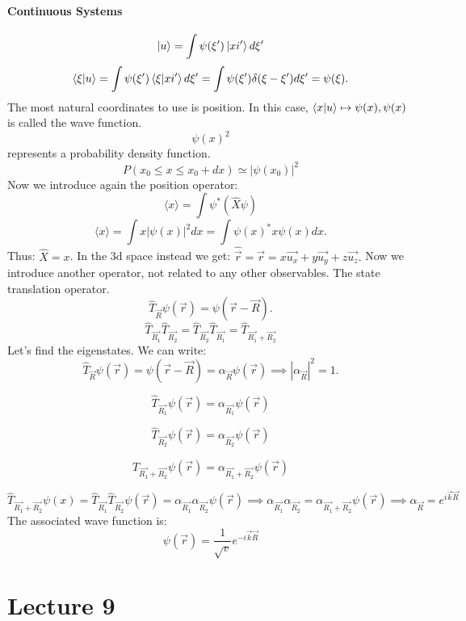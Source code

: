 \documentclass{article}
\begin{document}
\paragraph{Continuous Systems}

$$\ket{u} = \int \psi(\xi') \ket{xi'} d\xi'$$
$$\bra{\xi}\ket{u} = \int \psi (\xi') \bra{\xi}\ket{xi'}d\xi' = \int \psi (\xi') \delta(\xi -\xi') d\xi' =\psi(\xi).$$
The most natural coordinates to use is position. In this case,
$\bra{x}\ket{u} \mapsto \psi(x), \psi(x)$ is called the wave function.
$$\psi(x)^2$$ represents a probability density function.
$$P(x_0 \leq x \leq x_0 + dx) \simeq | \psi(x_0) |^2$$
Now we introduce again the position operator:
$$\langle x \rangle = \int \psi^* ( \hat{X} \psi)$$
$$ \langle x \rangle  = \int x | \psi(x) | ^2 dx = \int \psi(x)^* x \psi(x) dx.$$
Thus: $\hat{X} = x$. In the 3d space instead we get: $ \hat{\vec{r}} = \vec{r} = x \vec{u_x} + y \vec{u_y} + z \vec{u_z}. $
Now we introduce another operator, not related to any other observables. The state translation operator.
$$\hat{T}_{\vec{R}} \psi(\vec{r}) = \psi(\vec{r}-\vec{R}).$$
$$\hat{T}_{\vec{R_1}}\hat{T}_{\vec{R_2}} = \hat{T}_{\vec{R_2}}\hat{T}_{\vec{R_1}} = \hat{T}_{\vec{R_1}+ \vec{R_2}}$$
Let's find the eigenstates. We can write:
$$\hat{T}_{\vec{R}} \psi(\vec{r}) = \psi(\vec{r}-\vec{R}) = \alpha_{\vec{R}} \psi(\vec{r}) \implies |\alpha_{\vec{R}}|^2 = 1.$$

$$\hat{T}_{\vec{R_1}} \psi(\vec{r}) = \alpha_{\vec{R_1}} \psi(\vec{r})$$

$$\hat{T}_{\vec{R_2}} \psi(\vec{r}) =  \alpha_{\vec{R_2}}\psi(\vec{r})$$

$$ \hat{T}_{\vec{R_1} + \vec{R_2} } \psi(\vec{r}) = \alpha_{\vec{R_1} + \vec{R_2}} \psi(\vec{r}) $$

$$\hat{T}_{\vec{R_1} + \vec{R_2}} \psi(x) = \hat{T}_{\vec{R_1}}\hat{T}_{\vec{R_2}} \psi(\vec{r}) =\alpha_{\vec{R_1}} \alpha_{\vec{R_2}}\psi(\vec{r})  \implies \alpha_{\vec{R_1}} \alpha_{\vec{R_2}} = \alpha_{\vec{R_1} + \vec{R_2}} \psi(\vec{r}) \implies \alpha_{\vec{R}} = e^{i\vec{k}\vec{R}} $$
The associated wave function is:
$$\psi(\vec{r}) = \frac{1}{\sqrt{v}} e^{-i\vec{k}\vec{R}}$$

\section{Lecture 9}
\end{document}
